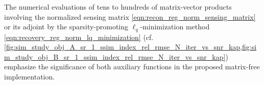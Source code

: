 The numerical evaluations of
tens to
hundreds of
matrix-vector products involving
the normalized sensing matrix
\eqref{eqn:recon_reg_norm_sensing_matrix} or
its adjoint by
the sparsity-promoting $\ell_{q}$-minimization method
\eqref{eqn:recovery_reg_norm_lq_minimization}
(cf. \cref{fig:sim_study_obj_A_sr_1_ssim_index_rel_rmse_N_iter_vs_snr_kap,fig:sim_study_obj_B_sr_1_ssim_index_rel_rmse_N_iter_vs_snr_kap}) emphasize
the significance of
both auxiliary functions in
the proposed matrix-free implementation.
